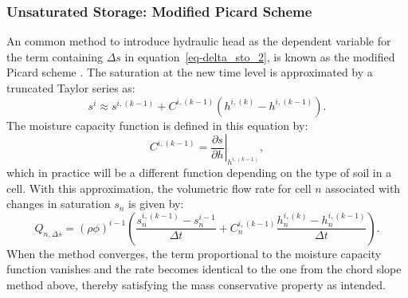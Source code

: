 \documentclass[fleqn]{article}
\begin{document}
\subsubsection*{Unsaturated Storage: Modified Picard Scheme}
An common method to introduce hydraulic head as the dependent
variable for the term containing $\Delta s$ in 
equation~\ref{eq-delta_sto_2}, is known as the modified Picard
scheme \cite{celia-1990}. The saturation at the new time
level is approximated by a truncated Taylor series as:
\begin{equation}
  s^i \approx s^{i,(k-1)} + 
  C^{i,(k-1)}
  \left( h^{i,(k)} - h^{i,(k-1)} \right).
  \label{eq-celia-taylor}
\end{equation}
The moisture capacity function is defined in this equation by:
\begin{equation}
  C^{i,(k-1)} = 
  \left. \frac{\partial s}{\partial h}\right|_{h^{i,(k-1)}},
  \label{eq-celia-moisture-cap-fun}
\end{equation}
which in practice will be a different function depending on
the type of soil in a cell. With this approximation, the volumetric
flow rate for cell $n$ associated with changes in saturation $s_n$ is
given by:
\begin{equation}
  Q_{n,\Delta s} = (\rho \phi)^{i-1}
  \left( 
  \frac{s_n^{i,(k-1)} - s_n^{i-1}}{\Delta t} +
  C_n^{i,(k-1)}
  \frac{h_n^{i,(k)} - h_n^{i,(k-1)}}{\Delta t}
  \right).
\end{equation}
When the method converges, the term proportional to the moisture
capacity function vanishes and the rate becomes identical to the
one from the chord slope method above, thereby satisfying the mass 
conservative property as intended.
\end{document}
